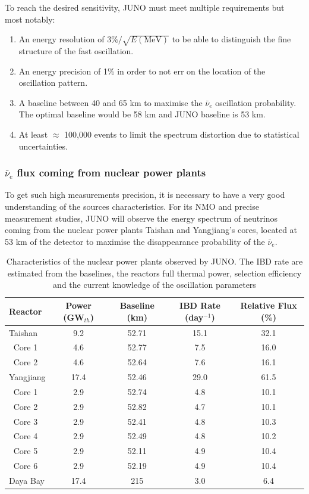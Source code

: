 \documentclass[../main.tex]{subfiles}
\begin{document}
To reach the desired sensitivity, JUNO must meet multiple requirements but most notably:
\begin{enumerate}
  \item An energy resolution of $3\%/\sqrt{E\mathrm{(MeV)}}$ to be able to distinguish the fine structure of the fast oscillation.
  \item An energy precision of 1\% in order to not err on the location of the oscillation pattern.
  \item A baseline between 40 and 65 km to maximise the $\bar{\nu}_e$ oscillation probability. The optimal baseline would be 58 km and JUNO baseline is 53 km.
  \item At least $\approx$ 100,000 events to limit the spectrum distortion due to statistical uncertainties.
\end{enumerate}

\subsubsection{$\bar{\nu}_e$ flux coming from nuclear power plants}
\label{sec:juno:nu_e_flux}

To get such high measurements precision, it is necessary to have a very good understanding of the sources characteristics. For its NMO and precise measurement studies, JUNO will observe the energy spectrum of neutrinos coming from the nuclear power plants Taishan and Yangjiang's cores, located at 53 km of the detector to maximise the disappearance probability of the $\bar{\nu}_e$.

\begin{table}[ht]
  \centering
  \begin{tabular}{l c c c c}
    \hline
    Reactor & Power (GW$_{th}$) & Baseline (km) & IBD Rate (day$^{-1}$) & Relative Flux (\%) \\
    \hline
    Taishan    & 9.2  & 52.71 & 15.1 & 32.1 \\
    $~$ Core 1 & 4.6  & 52.77 & 7.5  & 16.0 \\
    $~$ Core 2 & 4.6  & 52.64 & 7.6  & 16.1 \\
    Yangjiang  & 17.4 & 52.46 & 29.0 & 61.5 \\
    $~$ Core 1 & 2.9  & 52.74 & 4.8  & 10.1 \\
    $~$ Core 2 & 2.9  & 52.82 & 4.7  & 10.1 \\
    $~$ Core 3 & 2.9  & 52.41 & 4.8  & 10.3 \\
    $~$ Core 4 & 2.9  & 52.49 & 4.8  & 10.2 \\
    $~$ Core 5 & 2.9  & 52.11 & 4.9  & 10.4 \\
    $~$ Core 6 & 2.9  & 52.19 & 4.9  & 10.4 \\
    Daya Bay   & 17.4 & 215   & 3.0  & 6.4  \\
    \hline
  \end{tabular}
  \caption{Characteristics of the nuclear power plants observed by JUNO. The IBD rate are estimated from the baselines, the reactors full thermal power, selection efficiency and the current knowledge of the oscillation parameters}
  \label{tab:juno:power_plants}
\end{table}
\end{document}

